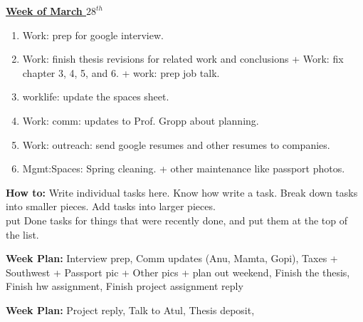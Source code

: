 \documentclass[11pt]{article}
\begin{document}
{\small \underline{\textbf{Week of March $28^{th}$}}}\\  
\begin{enumerate} 
\small \item \small Work: prep for google interview. 
\small \item \small Work: finish thesis revisions for related work and
conclusions + Work: fix chapter 3, 4, 5, and 6. + work: prep job
talk. 
\item \small worklife: update the spaces sheet. 
\small \item \small Work: comm: updates to Prof. Gropp about planning.  
\small \item \small Work: outreach:  send google resumes and other resumes to
companies. 
\item \small Mgmt:Spaces: Spring cleaning. + other maintenance like
  passport photos.  
\end{enumerate} 

\newpage 
\textbf{How to:} Write individual tasks here. Know how write a task. 
Break down tasks into smaller pieces. Add tasks into larger
pieces. \\ put Done tasks for things that were recently done, and put
them at the top of the list.




\textbf{Week Plan:} Interview prep, Comm updates (Anu, Mamta, Gopi),
Taxes + Southwest + Passport pic + Other pics + plan out weekend,
Finish the thesis,  Finish hw assignment, Finish project assignment reply

\textbf{Week Plan:} Project reply, Talk to Atul, Thesis deposit, 

\end{document}
